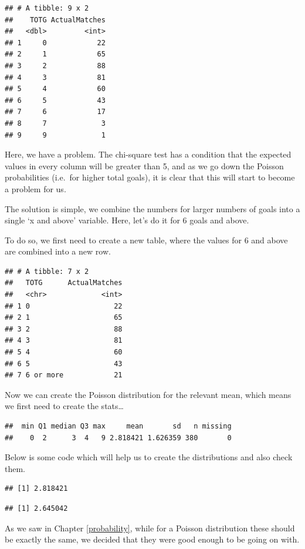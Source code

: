 \documentclass[
]{book}
\begin{document}
\begin{verbatim}
## # A tibble: 9 x 2
##    TOTG ActualMatches
##   <dbl>         <int>
## 1     0            22
## 2     1            65
## 3     2            88
## 4     3            81
## 5     4            60
## 6     5            43
## 7     6            17
## 8     7             3
## 9     9             1
\end{verbatim}

Here, we have a problem. The chi-square test has a condition that the expected values in every column will be greater than 5, and as we go down the Poisson probabilities (i.e.~for higher total goals), it is clear that this will start to become a problem for us.

The solution is simple, we combine the numbers for larger numbers of goals into a single `x and above' variable. Here, let's do it for 6 goals and above.

To do so, we first need to create a new table, where the values for 6 and above are combined into a new row.

\begin{verbatim}
## # A tibble: 7 x 2
##   TOTG      ActualMatches
##   <chr>             <int>
## 1 0                    22
## 2 1                    65
## 3 2                    88
## 4 3                    81
## 5 4                    60
## 6 5                    43
## 7 6 or more            21
\end{verbatim}

Now we can create the Poisson distribution for the relevant mean, which means we first need to create the stats\ldots{}

\begin{verbatim}
##  min Q1 median Q3 max     mean       sd   n missing
##    0  2      3  4   9 2.818421 1.626359 380       0
\end{verbatim}

Below is some code which will help us to create the distributions and also check them.

\begin{verbatim}
## [1] 2.818421
\end{verbatim}

\begin{verbatim}
## [1] 2.645042
\end{verbatim}

As we saw in Chapter \ref{probability}, while for a Poisson distribution these should be exactly the same, we decided that they were good enough to be going on with.
\end{document}
